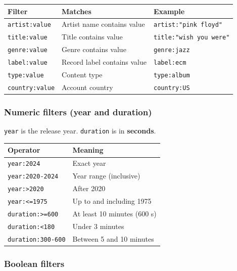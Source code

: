 \documentclass[11pt,a4paper]{article}
\begin{document}
\begin{center}
\begin{tabularx}{\linewidth}{@{}l X l@{}}
\toprule
\textbf{Filter} & \textbf{Matches} & \textbf{Example} \\
\midrule
\texttt{artist:value}   & Artist name contains value  & \texttt{artist:"pink floyd"} \\
\texttt{title:value}    & Title contains value        & \texttt{title:"wish you were"} \\
\texttt{genre:value}    & Genre contains value        & \texttt{genre:jazz} \\
\texttt{label:value}    & Record label contains value & \texttt{label:ecm} \\
\texttt{type:value}     & Content type                & \texttt{type:album} \\
\texttt{country:value}  & Account country             & \texttt{country:US} \\
\bottomrule
\end{tabularx}
\end{center}

\subsubsection{Numeric filters (year and duration)}

\texttt{year} is the release year.  \texttt{duration} is in \textbf{seconds}.

\begin{center}
\begin{tabular}{@{}ll@{}}
\toprule
\textbf{Operator} & \textbf{Meaning} \\
\midrule
\texttt{year:2024}        & Exact year \\
\texttt{year:2020-2024}   & Year range (inclusive) \\
\texttt{year:>2020}       & After 2020 \\
\texttt{year:<=1975}      & Up to and including 1975 \\
\texttt{duration:>=600}   & At least 10 minutes (600 s) \\
\texttt{duration:<180}    & Under 3 minutes \\
\texttt{duration:300-600} & Between 5 and 10 minutes \\
\bottomrule
\end{tabular}
\end{center}

\subsubsection{Boolean filters}
\end{document}
